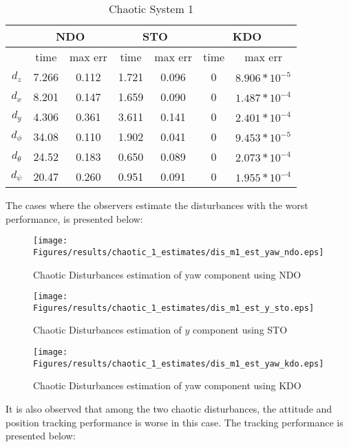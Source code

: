 \documentclass{article}
\begin{document}
\begin{table}[!htbp]
\centering
\caption{Chaotic System 1}
\begin{tabular}{*7c}
\toprule
{}  &  \multicolumn{2}{c}{NDO} & \multicolumn{2}{c}{STO} & \multicolumn{2}{c}{KDO}\\
\midrule
{}        &   time & max err  & time  &max err& time  & max err\\
$d_z$     &  7.266 & 0.112   & 1.721  & 0.096 & 0     & $8.906*10^{-5}$\\
$d_x$     &  8.201 & 0.147   & 1.659  & 0.090 & 0     & $1.487*10^{-4}$\\
$d_y$     &  4.306 & 0.361   & 3.611  & 0.141 & 0     & $2.401*10^{-4}$\\
$d_\phi$  &  34.08 & 0.110   & 1.902  & 0.041 & 0     & $9.453*10^{-5}$\\
$d_\theta$&  24.52 & 0.183   & 0.650  & 0.089 & 0     & $2.073*10^{-4}$\\
$d_\psi$  &  20.47 & 0.260   & 0.951  & 0.091 & 0     & $1.955*10^{-4}$\\

\bottomrule
\end{tabular}
\end{table}

The cases where the observers estimate the disturbances with the worst performance, is presented below:

\begin{figure}[H]
\centering
\texttt{[image: Figures/results/chaotic\_1\_estimates/dis\_m1\_est\_yaw\_ndo.eps]}
\caption{Chaotic Disturbances estimation of yaw component using NDO}
\label{dis_m1_est_yaw_ndo}
\end{figure}

\begin{figure}[H]
\centering
\texttt{[image: Figures/results/chaotic\_1\_estimates/dis\_m1\_est\_y\_sto.eps]}
\caption{Chaotic Disturbances estimation of $y$ component using STO}
\label{dis_m1_est_y_sto}
\end{figure}

\begin{figure}[H]
\centering
\texttt{[image: Figures/results/chaotic\_1\_estimates/dis\_m1\_est\_yaw\_kdo.eps]}
\caption{Chaotic Disturbances estimation of yaw component using KDO}
\label{dis_m1_est_yaw_kdo}
\end{figure}

It is also observed that among the two chaotic disturbances, the attitude and position tracking performance is worse in this case. The tracking performance is presented below: 
\end{document}
